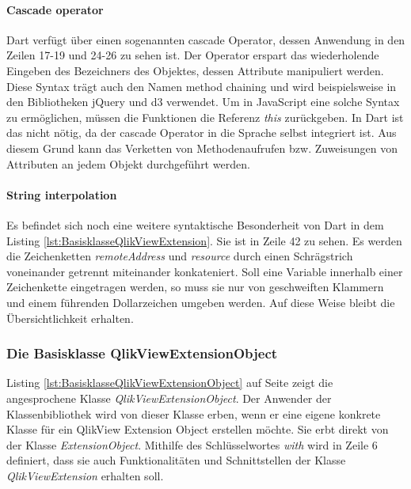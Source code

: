 \paragraph{Cascade operator} 
Dart verfügt über einen sogenannten cascade Operator, dessen Anwendung in den Zeilen 17-19 und 24-26 zu sehen ist. Der Operator erspart das wiederholende Eingeben des Bezeichners des Objektes, dessen Attribute manipuliert werden. Diese Syntax trägt auch den Namen method chaining und wird beispielsweise in den Bibliotheken jQuery und d3 verwendet. Um in JavaScript eine solche Syntax zu ermöglichen, müssen die Funktionen die Referenz \textit{this} zurückgeben. In Dart ist das nicht nötig, da der cascade Operator in die Sprache selbst integriert ist. Aus diesem Grund kann das Verketten von Methodenaufrufen bzw. Zuweisungen von Attributen an jedem Objekt durchgeführt werden.

\paragraph{String interpolation}
\label{lab:StringInterpolation}
Es befindet sich noch eine weitere syntaktische Besonder\-heit von Dart in dem Listing \ref{lst:BasisklasseQlikViewExtension}. Sie ist in Zeile 42 zu sehen. Es werden die Zeichenketten \textit{remoteAddress} und \textit{resource} durch einen Schrägstrich voneinander getrennt miteinander konkateniert. Soll eine Variable innerhalb einer Zeichenkette eingetragen werden, so muss sie nur von geschweiften Klammern und einem führenden Dollarzeichen umgeben werden. Auf diese Weise bleibt die Übersichtlich\-keit erhalten.

\subsubsection{Die Basisklasse QlikViewExtensionObject}
\label{lab:DieBasisklasseQlikViewExtensionObject}

Listing \ref{lst:BasisklasseQlikViewExtensionObject} auf Seite \pageref{lst:BasisklasseQlikViewExtensionObject} zeigt die angesprochene Klasse \textit{QlikViewExtensionObject}. Der Anwender der Klassen\-bibliothek wird von dieser Klasse erben, wenn er eine eigene konkrete Klasse für ein QlikView Extension Object erstellen möchte. Sie erbt direkt von der Klasse \textit{ExtensionObject}. Mithilfe des Schlüssel\-wortes \textit{with} wird in Zeile 6 definiert, dass sie auch Funktionalitäten und Schnittstellen der Klasse \textit{QlikViewExtension} erhalten soll.


